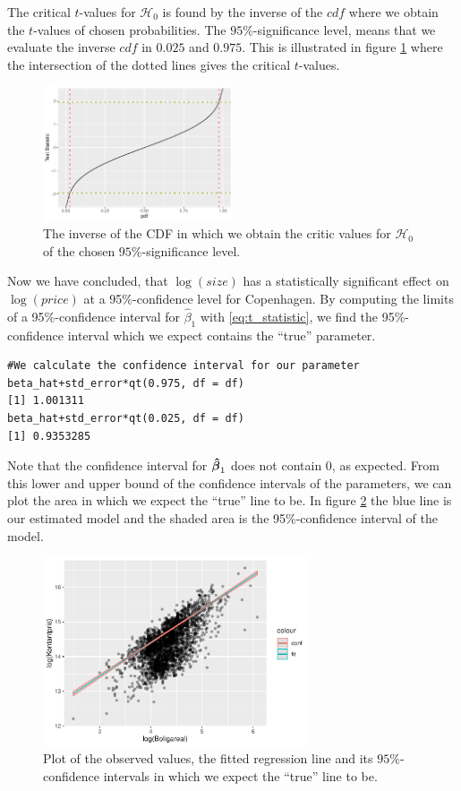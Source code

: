 The critical $t$-values for $\mathcal{H}_0$ is found by the inverse of the $cdf$ where we obtain the $t$-values of chosen probabilities. 
The $95\%$-significance level, means that we evaluate the inverse $cdf$ in $0.025$ and $0.975$. 
This is illustrated in figure \ref{fig:CDF_inverse} where the intersection of the dotted lines gives the critical $t$-values.
\begin{figure}[H]
    \centering
    \includegraphics[width = 0.5\textwidth]{figures/Nanna/Inverse_CDF.pdf}
    \caption{The inverse of the CDF in which we obtain the critic values for $\mathcal{H}_0$ of the chosen $95\%$-significance level.}
    \label{fig:CDF_inverse}
\end{figure}
Now we have concluded, that $\log(size)$ has a statistically significant effect on $\log(price)$ at a 95\%-confidence level for Copenhagen. 
By computing the limits of a 95\%-confidence interval for $\hat{\beta}_1$ with \eqref{eq:t_statistic}, we find the 95\%-confidence interval which we expect contains the ``true'' parameter.
\begin{lstlisting}
#We calculate the confidence interval for our parameter
beta_hat+std_error*qt(0.975, df = df)
[1] 1.001311
beta_hat+std_error*qt(0.025, df = df)
[1] 0.9353285
\end{lstlisting}
Note that the confidence interval for $\operatorname{\boldsymbol{\hat{\beta}}}_1$ does not contain 0, as expected.
From this lower and upper bound of the confidence intervals of the parameters, we can plot the area in which we expect the ``true'' line to be. 
In figure \ref{fig:t_distributionplot2} the blue line is our estimated model and the shaded area is the 95\%-confidence interval of the model. 
\begin{figure}[H]
    \centering
    \includegraphics[width = 0.7\textwidth]{figures/Nanna/Confidence_interval.pdf}
    \caption{Plot of the observed values, the fitted regression line and its $95\%$-confidence intervals in which we expect the ``true'' line to be.}
    \label{fig:t_distributionplot2}
\end{figure}


